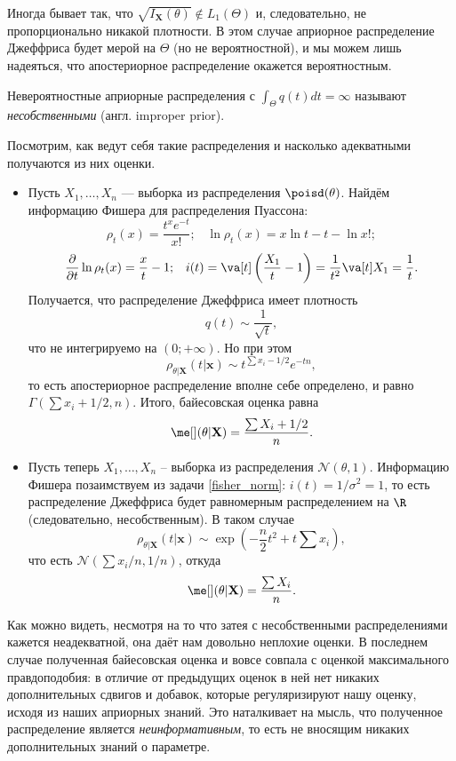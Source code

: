 Иногда бывает так, что $\sqrt{I_{\mathbf X}(\theta)} \notin L_1(\Theta)$ и, следовательно, не пропорционально никакой плотности. В этом случае априорное распределение Джеффриса будет мерой на $\Theta$ (но не вероятностной), и мы можем лишь надеяться, что апостериорное распределение окажется вероятностным.

\begin{definition}
    Невероятностные априорные распределения с $\int_{\Theta} q(t)dt = \infty$ называют \textit{несобственными} (англ. \textsf{improper prior}).
\end{definition}

\begin{example}\label{improper}
    Посмотрим, как ведут себя такие распределения и насколько адекватными получаются из них оценки.
    \begin{itemize}
        \item  Пусть $X_1, \ldots, X_n$ --- выборка из распределения $\poisd(\theta)$. Найдём информацию Фишера для распределения Пуассона:
    \[
    \rho_{t}(x) = \frac{t^xe^{-t}}{x!};\;\;\;\ln{\rho_{t}(x)} = x\ln{t} - t - \ln{x!};
    \]
    \[
    \frac{\partial}{\partial t} \ln{\rho_{t}(x)} = \frac{x}{t} - 1;\;\;\;i(t) = \va[t] \left(\frac{X_1}{t} - 1\right) = \frac{1}{t^2} \va[t] X_1 = \frac{1}{t}.
    \]
    Получается, что распределение Джеффриса имеет плотность 
    \[
    q(t) \sim \frac{1}{\sqrt{t}},
    \]
    что не интегрируемо на $(0; +\infty)$. Но при этом
    \[
    \rho_{\theta|\mathbf X}(t|\mathbf{x}) \sim t^{\sum x_i - 1/2} e^{-tn},
    \]
    то есть апостериорное распределение вполне себе определено, и равно $\Gamma\left(\sum x_i + 1/2, n\right)$. Итого, байесовская оценка равна
    \[
    \me[](\theta|\mathbf X) = \frac{\sum X_i + 1 / 2}{n}.
    \]
    \item Пусть теперь $X_1, \ldots, X_n$ -- выборка из распределения $\mathcal{N}(\theta, 1)$. Информацию Фишера позаимствуем из задачи \ref{fisher_norm}: $i(t) = 1 / \sigma^2 = 1$, то есть распределение Джеффриса будет равномерным распределением на $\R$ (следовательно, несобственным). В таком случае
    \[
    \rho_{\theta|\mathbf X}(t|\mathbf{x}) \sim \exp{\left(-\frac{n}{2}t^2 + t \sum x_i\right)},
    \]
    что есть $\mathcal{N}\left(\sum x_i / n, 1/n\right)$, откуда
    \[
    \me[](\theta|\mathbf X) = \frac{\sum X_i}{n}.
    \]
    \end{itemize}
    
\end{example}

    Как можно видеть, несмотря на то что затея с несобственными распределениями кажется неадекватной, она даёт нам довольно неплохие оценки. В последнем случае полученная байесовская оценка и вовсе совпала с оценкой максимального правдоподобия: в отличие от предыдущих оценок в ней нет никаких дополнительных сдвигов и добавок, которые регуляризируют нашу оценку, исходя из наших априорных знаний. Это наталкивает на мысль, что полученное распределение является \textit{неинформативным}, то есть не вносящим никаких дополнительных знаний о параметре. 

